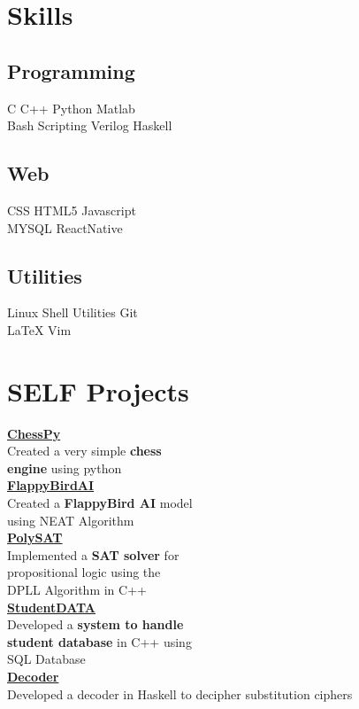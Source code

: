 \documentclass[]{deedy-resume-openfont}
\begin{document}
\begin{minipage}[t]{0.33\textwidth}
\section{Skills}
\subsection{Programming}
\textbullet{} C \textbullet{}   C++ \textbullet{} Python \textbullet{} Matlab \\ 
\textbullet{} Bash Scripting \textbullet Verilog \textbullet{} Haskell\\
\subsection{Web}
\textbullet{} CSS \textbullet{} HTML5 \textbullet{} Javascript\\
 \textbullet{}MYSQL \textbullet{}ReactNative   \\
\subsection{Utilities}
\textbullet{} Linux Shell Utilities \textbullet{} Git \\
\textbullet{} \LaTeX \textbullet{} Vim
\section{SELF Projects}
\textbf{\large \href{https://github.com/RohitRanjangit/chessPY}{ChessPy}}\\
Created  a very simple \textbf{ chess\\
	engine} using python\\
\textbf{\large \href{https://github.com/RohitRanjangit/FlappyBirdAI}{FlappyBirdAI}}\\
Created a \textbf{FlappyBird AI} model\\
using NEAT Algorithm\\
\textbf{\large \href{https://github.com/RohitRanjangit/PolySAT} {PolySAT}}\\
Implemented a \textbf{ SAT solver} for\\
propositional logic using the\\
DPLL Algorithm in C++\\
\textbf{\large \href{https://github.com/RohitRanjangit/StudentData}{StudentDATA}}\\
Developed a \textbf{ system to handle\\
	student database} in C++ using\\ SQL Database\\
\textbf{\large \href{https://github.com/RohitRanjangit/Decoder}{Decoder}}\\
Developed a decoder in Haskell to decipher substitution ciphers
%
%
\end{minipage} 
\end{document}
